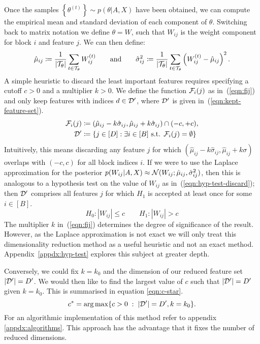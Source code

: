 Once the samples $\left\{ \theta^{(t)} \right\} \sim p(\theta | A, X)$
have been obtained, we can compute the empirical mean and standard deviation of each component of $\theta$. Switching back to matrix notation we define $\theta = W$, such that $W_{ij}$ is the weight component for block $i$ and feature $j$. We can then define:
%
\begin{equation}
	\hat{\mu}_{ij} \coloneqq \frac{1}{|\mathcal{T}_\theta|} \sum_{t \in \mathcal{T}_\theta} W_{ij}^{(t)} \qquad \textrm{and} \qquad
	\hat{\sigma}_{ij}^2 \coloneqq \frac{1}{|\mathcal{T}_\theta|} \sum_{t \in \mathcal{T}_\theta} \left( W_{ij}^{(t)} - \hat{\mu}_{ij} \right)^2.
\end{equation}
%
A simple heuristic to discard the least important features requires specifying a cutoff $c > 0$ and a multiplier $k > 0$. We define the function $\mathcal{F}_i(j)$ 
as in~(\ref{eqn:fij}) and only keep features with indices $d \in \mathcal{D}'$, where $\mathcal{D}'$ is given in~(\ref{eqn:kept-feature-set}).
%
\begin{align}
	\mathcal{F}_i(j) &\coloneqq (\hat{\mu}_{ij} - k \hat{\sigma}_{ij}, \hat{\mu}_{ij} + k \hat{\sigma}_{ij}) \cap (-c, +c),
	\label{eqn:fij} \\
	\mathcal{D}' &\coloneqq \left\{ j \in [D] : \exists i \in [B] \textrm{ s.t. }  \mathcal{F}_i(j) = \emptyset \right\}
	\label{eqn:kept-feature-set}
\end{align}
%
Intuitively, this means discarding any feature $j$ for which 
$(\hat{\mu}_{ij} - k\hat{\sigma}_{ij}, \hat{\mu}_{ij} + k \sigma)$ overlaps with
$(-c, c)$ for all block indices $i$. If we were to use the Laplace approximation for the posterior $p(W_{ij} | A, X) \approx \mathcal{N}(W_{ij}; \hat{\mu}_{ij}, \hat{\sigma}_{ij}^2)$, then this is analogous to a hypothesis test on the value of $W_{ij}$ as in~(\ref{eqn:hyp-test-discard});
then $\mathcal{D}'$ comprises all features $j$ for which $H_1$ is accepted at least once for some $i \in [B]$.
%
\begin{equation}
	H_0: |W_{ij}| \leq c \qquad
	H_1: |W_{ij}| > c
	\label{eqn:hyp-test-discard}
\end{equation}
%
The multiplier $k$ in~(\ref{eqn:fij}) determines the degree of significance of the result. However, as the Laplace approximation is not exact we will only treat this dimensionality reduction method as a useful heuristic and not an exact method. Appendix~\ref{appdx:hyp-test} explores this subject at greater depth.

Conversely, we could fix $k=k_0$ and the dimension of our reduced feature set $|\mathcal{D}'|=D'$. We would then like to find the largest value of $c$ such that $|\mathcal{D}'|=D'$ given $k=k_0$. This is summarised in equation \ref{eqn:c-star}.
%
\begin{equation}
	c^* = \operatorname*{arg\,max} \{c>0\; : \;|\mathcal{D}'| = D', k=k_0\}.
	\label{eqn:c-star}
\end{equation}
%
For an algorithmic implementation of this method refer to appendix \ref{appdx:algorithms}. This approach has the advantage that it fixes the number of reduced dimensions.
